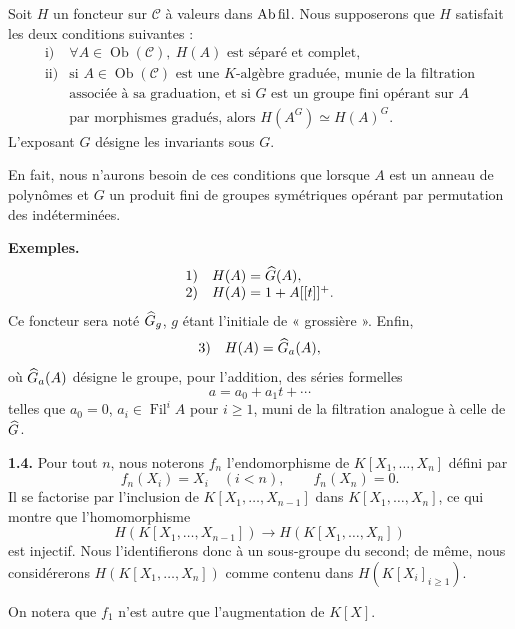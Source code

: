 \documentclass[11pt]{article}
\newcommand{\Fil}{\operatorname{Fil}}
\begin{document}
Soit \(H\) un foncteur sur \(\mathcal C\) à valeurs dans \(\mathrm{Ab\,fil}\). Nous supposerons que \(H\) satisfait les deux conditions suivantes :
\[
\begin{array}{ll}
\text{i)} & \forall A\in\operatorname{Ob}(\mathcal C),\ H(A)\text{ est séparé et complet},\\[0.3em]
\text{ii)} & \text{si }A\in\operatorname{Ob}(\mathcal C)\text{ est une }K\text{-algèbre graduée, munie de la filtration}\\
& \text{associée à sa graduation, et si }G\text{ est un groupe fini opérant sur }A\\
& \text{par morphismes gradués, alors }H(A^G)\simeq H(A)^G .
\end{array}
\]
L'exposant \(G\) désigne les invariants sous \(G\).

En fait, nous n'aurons besoin de ces conditions que lorsque \(A\) est un anneau de polynômes et \(G\) un produit fini de groupes symétriques opérant par permutation des indéterminées.

\textbf{Exemples.}
\[
\begin{array}{ll}
1)& H(A)=\widehat G(A),\\
2)& H(A)=1+A[[t]]^+.
\end{array}
\]
Ce foncteur sera noté \(\widehat G_g\), \(g\) étant l'initiale de « grossière ». Enfin,
\[
3)\quad H(A)=\widehat G_a(A),
\]
où \(\widehat G_a(A)\) désigne le groupe, pour l'addition, des séries formelles
\[
  a=a_0+a_1t+\cdots
\]
telles que \(a_0=0\), \(a_i\in\Fil^i A\) pour \(i\geq 1\), muni de la filtration analogue à celle de \(\widehat G\).

\textbf{1.4.} Pour tout \(n\), nous noterons \(f_n\) l'endomorphisme de \(K[X_1,\ldots,X_n]\) défini par
\[
  f_n(X_i)=X_i\quad (i<n),\qquad f_n(X_n)=0.
\]
Il se factorise par l'inclusion de \(K[X_1,\ldots,X_{n-1}]\) dans \(K[X_1,\ldots,X_n]\), ce qui montre que l'homomorphisme
\[
  H(K[X_1,\ldots,X_{n-1}])\longrightarrow H(K[X_1,\ldots,X_n])
\]
est injectif. Nous l'identifierons donc à un sous-groupe du second; de même, nous considérerons \(H(K[X_1,\ldots,X_n])\) comme contenu dans \(H(K[X_i]_{i\geq 1})\).

On notera que \(f_1\) n'est autre que l'augmentation de \(K[X]\).
\end{document}
